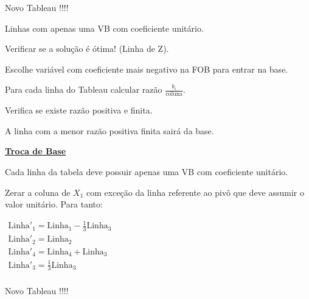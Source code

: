 \begin{frame}
\begin{columns}
\begin{column}{0.5\textwidth}
		{
			\begin{mdframed}[backgroundcolor=orange!80]
				Novo Tableau !!!!
			\end{mdframed}
			Linhas com apenas uma VB com coeficiente unitário.
		}
		{
			\begin{mdframed}[backgroundcolor=olive!80]
				Verificar se a solução é ótima! (Linha de Z).
			\end{mdframed}
		}
		{
			\begin{mdframed}[backgroundcolor=orange!80]
				Escolhe variável com coeficiente mais negativo na FOB para entrar na base.
			\end{mdframed}
		}	
		{
			\begin{mdframed}[backgroundcolor=olive!80]
				Para cada linha do Tableau calcular razão $\frac{b_i}{\text{coluna}}$.
			\end{mdframed}
		}		
		{
			\begin{mdframed}[backgroundcolor=orange!80]
				Verifica se existe razão positiva e finita.
			\end{mdframed}
		}	
		{
			\begin{mdframed}[backgroundcolor=olive!80]
				A linha com a menor razão positiva finita sairá da base.
			\end{mdframed}
		}	
		{
			\underline{\textbf{Troca de Base}}
			\begin{mdframed}[backgroundcolor=orange!80]
				Cada linha da tabela deve possuir apenas uma VB com coeficiente unitário.
			\end{mdframed}
		}	
		{
			\scriptsize Zerar a coluna de $X_1$ com exceção da linha referente ao pivô que deve assumir o valor unitário. Para tanto: 
			\begin{mdframed}[backgroundcolor=olive!80]
					\centering
					$
						\begin{matrix}
							\text{Linha}'_1 = \text{Linha}_1 - \frac{1}{3}\text{Linha}_3\\ 
							\text{Linha}'_2 = \text{Linha}_2\\ 
							\text{Linha}'_4 = \text{Linha}_4 + \text{Linha}_3 \\ 
							\text{Linha}'_3 = \frac{1}{3}\text{Linha}_3 \\						 
						\end{matrix}
					$
			\end{mdframed}
		}		
		{
			\begin{mdframed}[backgroundcolor=orange!80]
				Novo Tableau !!!!

\end{mdframed}}
\end{column}
\end{columns}
\end{frame}
